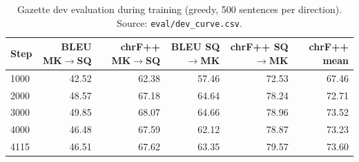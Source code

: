 \begin{table}[t]
\centering
\small
\begin{tabular}{lrrrrr}
\toprule
Step & BLEU MK$\rightarrow$SQ & chrF++ MK$\rightarrow$SQ & BLEU SQ$\rightarrow$MK & chrF++ SQ$\rightarrow$MK & chrF++ mean \\
\midrule
1000 & 42.52 & 62.38 & 57.46 & 72.53 & 67.46 \\
2000 & 48.57 & 67.18 & 64.64 & 78.24 & 72.71 \\
3000 & 49.85 & 68.07 & 64.66 & 78.96 & 73.52 \\
4000 & 46.48 & 67.59 & 62.12 & 78.87 & 73.23 \\
4115 & 46.51 & 67.62 & 63.35 & 79.57 & 73.60 \\
\bottomrule
\end{tabular}
\caption{Gazette dev evaluation during training (greedy, 500 sentences per direction). Source: \texttt{eval/dev\_curve.csv}.}
\label{tab:e01-dev_curve}
\end{table}
